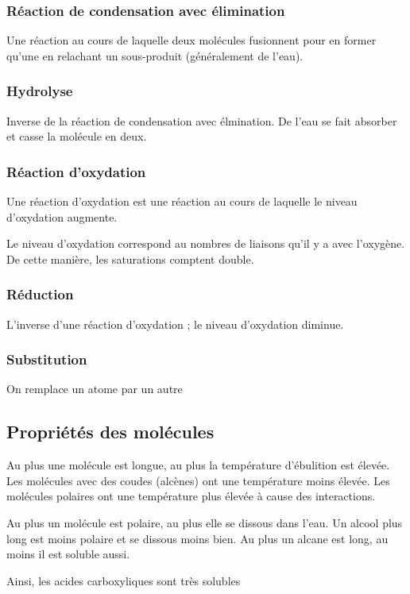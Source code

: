 \documentclass[a4paper]{article}
\begin{document}
    \subsubsection{Réaction de condensation avec élimination}
    Une réaction au cours de laquelle deux molécules fusionnent pour en former
    qu'une en relachant un sous-produit (généralement de l'eau).
    \subsubsection{Hydrolyse}
    Inverse de la réaction de condensation avec élmination. De l'eau se fait
    absorber et casse la molécule en deux.
    \subsubsection{Réaction d'oxydation}
    Une réaction d'oxydation est une réaction au cours de laquelle le niveau
    d'oxydation augmente.

    Le niveau d'oxydation correspond au nombres de liaisons qu'il y a avec
    l'oxygène. De cette manière, les saturations comptent double.

    \subsubsection{Réduction} 
    L'inverse d'une réaction d'oxydation ; le niveau d'oxydation diminue.
    \subsubsection{Substitution}
    On remplace un atome par un autre


    \subsection{Propriétés des molécules}
        Au plus une molécule est longue, au plus la température d'ébulition est élevée. Les molécules avec des coudes (alcènes) ont une température moins élevée. Les molécules polaires ont une température plus élevée à cause des interactions.

        Au plus un molécule est polaire, au plus elle se dissous dans l'eau. Un alcool plus long est moins polaire et se dissous moins bien. Au plus un alcane est long, au moins il est soluble aussi.

        Ainsi, les acides carboxyliques sont très solubles
\end{document}
